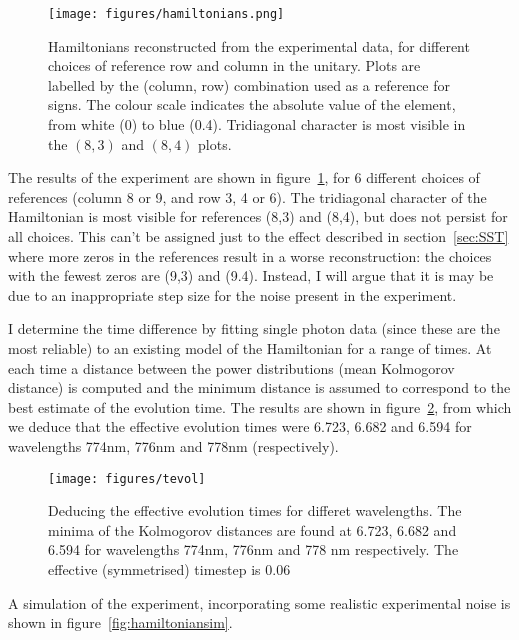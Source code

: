 \begin{figure}
  \centering
  \texttt{[image: figures/hamiltonians.png]}
  \caption[Reconstructed Hamiltonians]
  {Hamiltonians reconstructed from the experimental data, for different choices
  of reference row and column in the unitary. Plots are labelled by the (column,
  row) combination used as a reference for signs. The colour scale indicates the
  absolute value of the element, from white (0) to blue (0.4). Tridiagonal
  character is most visible in the \(\left(8,3\right)\) and \(\left(8,4\right)\)
  plots.}
  \label{fig:hamiltonians}
\end{figure}

The results of the experiment are shown in figure~\ref{fig:hamiltonians}, for 6
different choices of references (column 8 or 9, and row 3, 4 or 6). The
tridiagonal character of the Hamiltonian is most visible for references (8,3)
and (8,4), but does not persist for all choices. This can't be assigned just to
the effect described in section~\ref{sec:SST} where more zeros in the references
result in a worse reconstruction: the choices with the fewest zeros are (9,3)
and (9.4). Instead, I will argue that it is may be due to an inappropriate step
size for the noise present in the experiment.

I determine the time difference by fitting single photon data (since these are
the most reliable) to an existing model of the Hamiltonian  for a range of times. At each time a distance between the power
distributions (mean Kolmogorov distance) is computed and the minimum distance is
assumed to correspond to the best estimate of the evolution time. The results
are shown in figure~\ref{fig:tevol}, from which we deduce that the effective
evolution times were 6.723, 6.682 and 6.594 for wavelengths 774nm, 776nm and
778nm (respectively).

\begin{figure}
  \centering
  \texttt{[image: figures/tevol]}
  \caption[Deducing the effective evolution times for different wavelengths]
  {Deducing the effective evolution times for differet wavelengths. The minima
  of the Kolmogorov distances are found at 6.723, 6.682 and 6.594 for
  wavelengths 774nm, 776nm and 778 nm respectively. The effective (symmetrised)
  timestep is 0.06}
  \label{fig:tevol}
\end{figure}

A simulation of the experiment, incorporating some realistic experimental noise
is shown in figure~\ref{fig:hamiltoniansim}.

